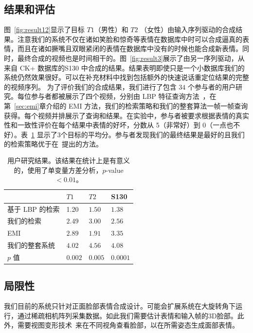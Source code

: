 \subsection{结果和评估}
图~\ref{fig:result12}显示了目标 $T1$（男性）和 $T2$ （女性）由输入序列驱动的合成结果。注意我们的系统不仅在诸如笑脸和惊奇等表情在数据库中时可以合成逼真的表情，而且在诸如撅嘴且双眼紧闭的表情在数据库中没有的时候也能合成新表情。同时，最终合成的视频也是时间相干的。图~\ref{fig:result3}展示了由另一序列驱动，从来自 CK+ 数据库的S130 中合成的结果。结果表明即使只是一个小数据库我们的系统仍然效果很好。可以在补充材料中找到包括额外的快速说话重定位结果的完整的视频序列。
为了评价我们的合成结果，我们进行了包含 $34$ 个参与者的用户研究。每位参与者都被展示了四个视频，分别由 LBP 特征查询方法~\cite{eccv10}，在第~\ref{sec:emi}章介绍的 EMI 方法，我们的检索策略和我们的整套算法一帧一帧查询获得。每个视频并排展示了查询和结果。在实验中，参与者被要求根据表情的真实性和一致性评价在每个结果中表情的好坏，分数从 5（非常好）到 0（一点也不好）。表~\ref{tab:userstudy} 显示了3个目标的平均分。参与者发现我们的最终结果是最好的且我们的检索策略优于在~\cite{eccv10}提出的方法。
\renewcommand{\tablename}{表}
\begin{table}[htp]
\centering
    \begin{tabular}{|l|p{1cm}|p{1cm}|p{1cm}|}
    \hline
    & $T1$ & $T2$ & S130\\
    \hline\hline
    基于 LBP 的检索 \cite{eccv10} & 1.20 & $1.50$ & $1.38$\\
    我们的检索 & $2.49$ & $3.00$ & $2.56$\\
    EMI & $2.89$ & $1.91$ & $3.35$\\
    我们的整套系统 & $\mathbf{4.02}$ & $\mathbf{4.56}$ & $\mathbf{4.08}$\\
    \hline\hline
    $p$ 值 & $0.002$ & $0.005$ & $0.0001$ \\
    \hline
    \end{tabular}
    \caption{用户研究结果。该结果在统计上是有意义的，使用了单变量方差分析，$p$-value $<0.01$。}
    \label{tab:userstudy}
\end{table}

\subsection{局限性}
我们目前的系统只针对正面脸部表情合成设计。可能会扩展系统在大旋转角下运行，通过稀疏相机阵列采集数据。如此我们需要估计表情和输入帧的3D脸部。此外，需要视图变形技术~\cite{ViewMorphing}来在不同视角查看脸部，以在所需姿态生成面部表情。

